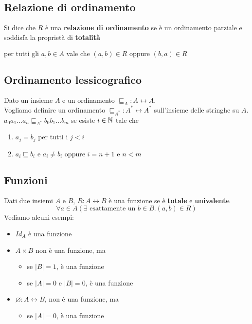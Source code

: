 \documentclass{article}
\begin{document}
\subsection*{Relazione di ordinamento}
Si dice che \(R\) è una \textbf{relazione di ordinamento} se è un ordinamento parziale e soddisfa la proprietà di \textbf{totalità}
\begin{center}
    per tutti gli \(a,b \in A\) vale che \((a,b) \in R\) oppure \((b,a) \in R\)
\end{center}
\subsection*{Ordinamento lessicografico}
Dato un insieme \(A\) e un ordinamento \(\sqsubseteq_A: A \leftrightarrow A\). \\
Vogliamo definire un ordinamento \(\sqsubseteq_{A^*}: A^* \leftrightarrow A^*\) sull'insieme delle stringhe su \(A\). \\
\(a_0 a_1 \ldots a_n \sqsubseteq_{A^*} b_0 b_1 \ldots b_m\) se esiste \(i \in \mathbb{N}\) tale che
\begin{enumerate}
    \item \(a_j = b_j\) per tutti i \(j < i\)
    \item \(a_i \sqsubseteq b_i\) e \(a_i \neq b_i\) oppure \(i = n + 1\) e \(n < m\)
\end{enumerate}

\pagebreak

\subsection{Funzioni}
Dati due insiemi \(A\) e \(B\), \(R: A \leftrightarrow B\) è una funzione se è \textbf{totale} e \textbf{univalente}
\[\forall a \in A (\exists \text{ esattamente un } b \in B . (a,b) \in R)\]
Vediamo alcuni esempi:
\begin{itemize}
    \item \(Id_A\) è una funzione
    \item \(A \times B\) non è una funzione, ma
          \begin{itemize}
              \item se \(\lvert B \rvert = 1\), è una funzione
              \item se \(\lvert A \rvert = 0\) e \(\lvert B \rvert = 0\), è una funzione
          \end{itemize}
    \item \(\varnothing: A \leftrightarrow B\), non è una funzione, ma
          \begin{itemize}
              \item se \(\lvert A \rvert = 0\), è una funzione
          \end{itemize}
\end{itemize}
\end{document}
